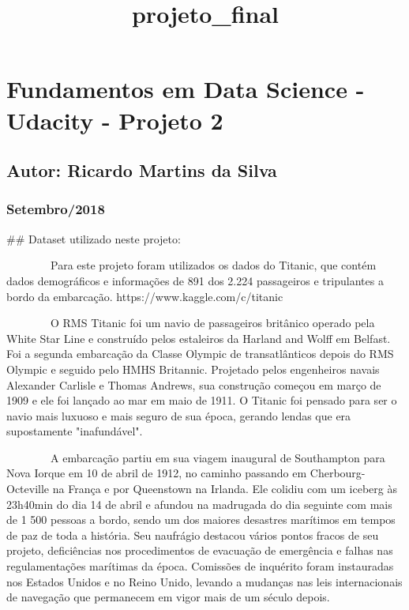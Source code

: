 \documentclass[11pt]{article}
\title{projeto\_final}
\begin{document}
    
    
    \maketitle
    
    

    
    \section{Fundamentos em Data Science - Udacity - Projeto
2}\label{fundamentos-em-data-science---udacity---projeto-2}

\subsection{Autor: Ricardo Martins da
Silva}\label{autor-ricardo-martins-da-silva}

\subsubsection{Setembro/2018}\label{setembro2018}

    \#\# Dataset utilizado neste projeto:

    Para este projeto foram utilizados os dados do Titanic, que contém
dados demográficos e informações de 891 dos 2.224 passageiros e
tripulantes a bordo da embarcação. https://www.kaggle.com/c/titanic

        O RMS Titanic foi um navio de passageiros britânico operado pela
White Star Line e construído pelos estaleiros da Harland and Wolff em
Belfast. Foi a segunda embarcação da Classe Olympic de transatlânticos
depois do RMS Olympic e seguido pelo HMHS Britannic. Projetado pelos
engenheiros navais Alexander Carlisle e Thomas Andrews, sua construção
começou em março de 1909 e ele foi lançado ao mar em maio de 1911. O
Titanic foi pensado para ser o navio mais luxuoso e mais seguro de sua
época, gerando lendas que era supostamente "inafundável".

    A embarcação partiu em sua viagem inaugural de Southampton para Nova
Iorque em 10 de abril de 1912, no caminho passando em
Cherbourg-Octeville na França e por Queenstown na Irlanda. Ele colidiu
com um iceberg às 23h40min do dia 14 de abril e afundou na madrugada do
dia seguinte com mais de 1 500 pessoas a bordo, sendo um dos maiores
desastres marítimos em tempos de paz de toda a história. Seu naufrágio
destacou vários pontos fracos de seu projeto, deficiências nos
procedimentos de evacuação de emergência e falhas nas regulamentações
marítimas da época. Comissões de inquérito foram instauradas nos Estados
Unidos e no Reino Unido, levando a mudanças nas leis internacionais de
navegação que permanecem em vigor mais de um século depois.
\end{document}
